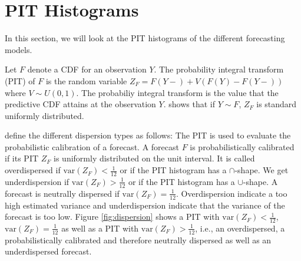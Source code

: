 \section{PIT Histograms}


In this section, we will look at the PIT histograms of the different forecasting models. 

Let \(F\) denote a CDF for an observation \(Y\). The probability integral 
transform (PIT) of \(F\) is the random variable \(Z_F = F(Y-) + V(F(Y) - F(Y-))\) 
where \(V \sim U(0,1)\). 
The probabiliy integral transform is the value that the predictive CDF 
attains at the observation \(Y\). \Textcite{Rueschendorf2009} shows that if \(Y \sim F\), \(Z_F\) is standard uniformly distributed.

\Textcite{Gneiting2014} define the different dispersion types as follows:
The PIT is used to evaluate the probabilistic calibration of a forecast. 
A forecast \(F\) is probabilistically calibrated if its PIT \(Z_F\) 
is uniformly distributed on the unit interval. 
It is called overdispersed if \(\mathrm{var}(Z_F) < \frac{1}{12}\) or if 
the PIT histogram has a \(\cap\)-shape. We get underdispersion if 
\(\mathrm{var}(Z_F) > \frac{1}{12}\) or if the PIT histogram has a \(\cup\)-shape. 
A forecast is neutrally dispersed if \(\mathrm{var}(Z_F) = \frac{1}{12}\).
Overdispersion indicate a too high estimated variance and underdispersion indicate 
that the variance of the forecast is too low. 
Figure \ref{fig:dispersion} shows a PIT with \(\mathrm{var}(Z_F) < \frac{1}{12}\), 
\(\mathrm{var}(Z_F) = \frac{1}{12}\) as well as a PIT with \(\mathrm{var}(Z_F) > \frac{1}{12}\), 
i.e., an overdispersed, a probabilistically calibrated and therefore neutrally dispersed as well as an underdispersed forecast.

